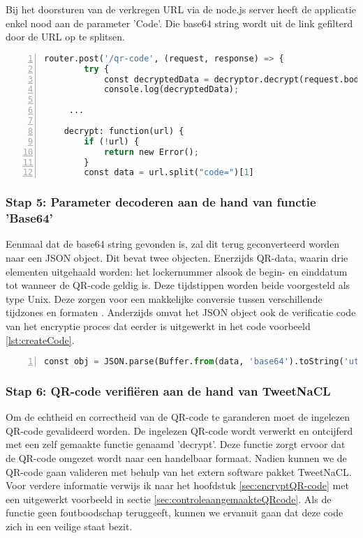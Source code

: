 Bij het doorsturen van de verkregen URL via de node.js server heeft de applicatie enkel nood aan de parameter 'Code'\autocite{Weir2012}.  Die base64 string wordt uit de link gefilterd door de URL op te splitsen. 

\begin{lstlisting}[language=Python, caption={Python script om parameter code uit de link te halen.}, label={lst:pythonLinkSplitting}, numbers=left]
    router.post('/qr-code', (request, response) => {
        try {
            const decryptedData = decryptor.decrypt(request.body.tag);
            console.log(decryptedData);
            
     ...
    
    decrypt: function(url) {
        if (!url) {
            return new Error();
        }
        const data = url.split("code=")[1]
\end{lstlisting}

\subsubsection{Stap 5: Parameter decoderen aan de hand van functie 'Base64'}
Eenmaal dat de base64 string gevonden is, zal dit terug geconverteerd worden naar een \ac{JSON} object. Dit bevat twee objecten. Enerzijds QR-data, waarin drie elementen uitgehaald worden: het lockernummer alsook de begin- en einddatum tot wanneer de QR-code geldig is. Deze tijdstippen worden beide voorgesteld als type Unix. Deze zorgen voor een makkelijke conversie tussen verschillende tijdzones en formaten \autocite{Ritchie1978}. Anderzijds omvat het \ac{JSON} object ook de verificatie code van het encryptie proces dat eerder is uitgewerkt in het code voorbeeld \ref{lst:createCode}. 

\begin{lstlisting}[language=Python, caption={Python code om parameter code te decoderen en informatie op te halen uit het object.}, label={lst:pythonLinkSplitting}, numbers=left]
    const obj = JSON.parse(Buffer.from(data, 'base64').toString('utf8')); 
\end{lstlisting}

\subsubsection{Stap 6: QR-code verifiëren aan de hand van TweetNaCL}

Om de echtheid en correctheid van de QR-code te garanderen moet de ingelezen QR-code gevalideerd worden. De ingelezen QR-code wordt verwerkt en ontcijferd met een zelf gemaakte functie genaamd 'decrypt'. Deze functie zorgt ervoor dat de QR-code omgezet wordt naar een handelbaar formaat. Nadien kunnen we de QR-code gaan valideren met behulp van het extern software pakket TweetNaCL. Voor verdere informatie verwijs ik naar het hoofdstuk \ref{sec:encryptQR-code} met een uitgewerkt voorbeeld in sectie \ref{sec:controleaangemaakteQRcode}. Als de functie geen foutboodschap teruggeeft, kunnen we ervanuit gaan dat deze code zich in een veilige staat bezit.

